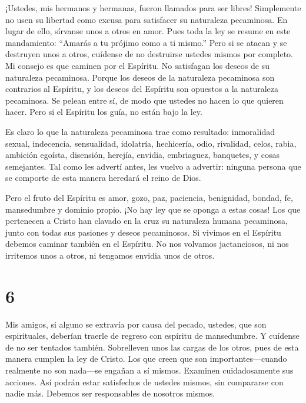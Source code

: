 ¡Ustedes, mis hermanos y hermanas, fueron llamados para
ser libres! Simplemente no usen su libertad como excusa para satisfacer
su naturaleza pecaminosa. En lugar de ello, sírvanse unos a otros en
amor.  Pues toda la ley se resume en este mandamiento:
``Amarás a tu prójimo como a ti mismo.''  Pero si se atacan
y se destruyen unos a otros, cuídense de no destruirse ustedes mismos
por completo.  Mi consejo es que caminen por el Espíritu.
No satisfagan los deseos de su naturaleza pecaminosa. 
Porque los deseos de la naturaleza pecaminosa son contrarios al
Espíritu, y los deseos del Espíritu son opuestos a la naturaleza
pecaminosa. Se pelean entre sí, de modo que ustedes no hacen lo que
quieren hacer.  Pero si el Espíritu los guía, no están bajo
la ley.

 Es claro lo que la naturaleza pecaminosa trae como
resultado: inmoralidad sexual, indecencia, sensualidad, 
idolatría, hechicería, odio, rivalidad, celos, rabia, ambición egoísta,
disensión, herejía,  envidia, embriaguez, banquetes, y
cosas semejantes. Tal como les advertí antes, les vuelvo a advertir:
ninguna persona que se comporte de esta manera heredará el reino de
Dios.

 Pero el fruto del Espíritu es amor, gozo, paz, paciencia,
benignidad, bondad, fe,  mansedumbre y dominio propio. ¡No
hay ley que se oponga a estas cosas!  Los que pertenecen a
Cristo han clavado en la cruz su naturaleza humana pecaminosa, junto con
todas sus pasiones y deseos pecaminosos.  Si vivimos en el
Espíritu debemos caminar también en el Espíritu.  No nos
volvamos jactanciosos, ni nos irritemos unos a otros, ni tengamos
envidia unos de otros.

\hypertarget{section-5}{%
\section{6}\label{section-5}}

 Mis amigos, si alguno se extravía por causa del pecado,
ustedes, que son espirituales, deberían traerle de regreso con espíritu
de mansedumbre. Y cuídense de no ser tentados también. 
Sobrelleven unos las cargas de los otros, pues de esta manera cumplen la
ley de Cristo.  Los que creen que son importantes---cuando
realmente no son nada---se engañan a sí mismos.  Examinen
cuidadosamente sus acciones. Así podrán estar satisfechos de ustedes
mismos, sin compararse con nadie más.  Debemos ser
responsables de nosotros mismos.

